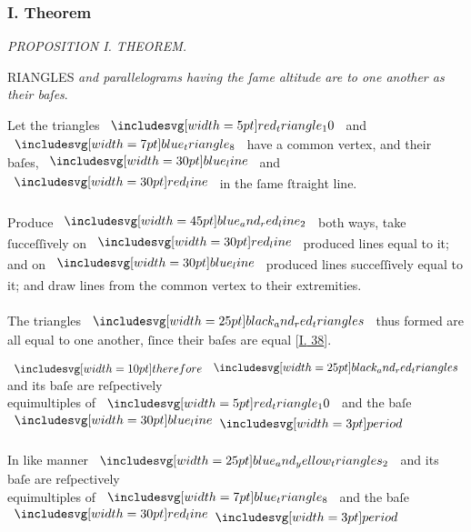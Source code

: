 \documentclass[11pt,preview]{standalone}
\begin{document}
\subsubsection{I. Theorem}

\begin{minipage}[t]{0.43\textwidth}
    \vspace{20pt}
    
\end{minipage}%
\hfill
\begin{minipage}[t]{0.54\textwidth}
    \begin{center}
        \textit{PROPOSITION I. THEOREM.}\label{book6pr1} \\
    \end{center}

    \hfill

    \begin{center}
        \raggedright \lettrine[lines=3, loversize=1, nindent=0pt]{}{}RIANGLES \textit{and parallelograms having the ſame altitude are to one another as their baſes}.
    \end{center}
\end{minipage}

\hfill

\hfill

\raggedright Let the triangles $\img[0][0][5]{red_triangle_10}$ and $\img[0][0][7]{blue_triangle_8}$  have a common vertex, and their baſes, $\blueline$ and $\redline$ in the ſame ſtraight line.\\
\hfill\\
Produce $\bimg{blue_and_red_line_2}$ both ways, take ſucceſſively on $\redline$ produced lines equal to it; and on $\blueline$ produced lines succeſſively equal to it; and draw lines from the common vertex to their extremities.\\
\hfill\\
The triangles $\img{black_and_red_triangles}$ thus formed are all equal to one another, ſince their baſes are equal [\hyperref[book1pr38]{\textsc{I.} 38}].

\hfill

\begin{center}
    $\btherefore \img{black_and_red_triangles}$ and its baſe are reſpectively\\
    equimultiples of $\img[0][0][5]{red_triangle_10}$ and the baſe $\blueline \bperiod$\\
    \hfill\\
    In like manner $\img{blue_and_yellow_triangles_2}$ and its baſe are reſpectively\\
    equimultiples of $\img[0][0][7]{blue_triangle_8}$ and the baſe $\redline \bperiod$
\end{center}
\end{document}
